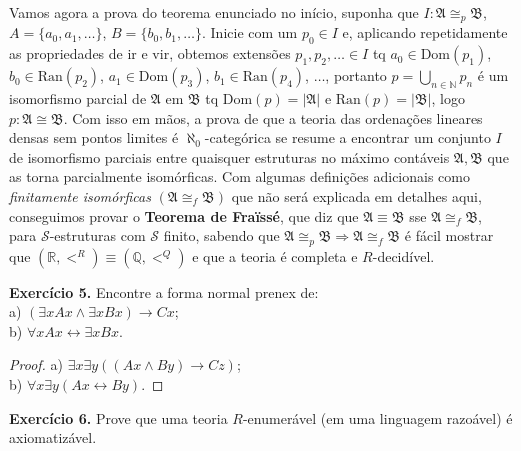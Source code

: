 \documentclass[11pt]{article}
\newcommand{\mc}[1]{\mathcal{#1}}
\newcommand{\mf}[1]{\mathfrak{#1}}
\newcommand{\mbb}[1]{\mathbb{#1}}
\begin{document}
\begin{shaded}
Vamos agora a prova do teorema enunciado no início, suponha que $I:\mf{A}\cong_p\mf{B}$, $A=\{a_0,a_1,\dots\}$, $B=\{b_0,b_1,\dots\}$. Inicie com um $p_0\in I$ e, aplicando repetidamente as propriedades de ir e vir, obtemos extensões $p_1,p_2,\dots\in I$ tq $a_0\in\text{Dom}(p_1)$, $b_0\in\text{Ran}(p_2)$, $a_1\in\text{Dom}(p_3)$, $b_1\in\text{Ran}(p_4)$, $\dots$, portanto $p=\bigcup_{n\in\mbb{N}}p_n$ é um isomorfismo parcial de $\mf{A}$ em $\mf{B}$ tq $\text{Dom}(p)=|\mf{A}|$ e $\text{Ran}(p)=|\mf{B}|$, logo $p:\mf{A}\cong\mf{B}$. Com isso em mãos, a prova de que a teoria das ordenações lineares densas sem pontos limites é $\aleph_0$-categórica se resume a encontrar um conjunto $I$ de isomorfismo parciais entre quaisquer estruturas no máximo contáveis $\mf{A},\mf{B}$ que as torna parcialmente isomórficas. Com algumas definições adicionais como \textit{finitamente isomórficas} $(\mf{A}\cong_f\mf{B})$ que não será explicada em detalhes aqui, conseguimos provar o \textbf{Teorema de Fraïssé}, que diz que $\mf{A}\equiv\mf{B}$ sse $\mf{A}\cong_f\mf{B}$, para $\mc{S}$-estruturas com $\mc{S}$ finito, sabendo que $\mf{A}\cong_p\mf{B}\Rightarrow\mf{A}\cong_f\mf{B}$ é fácil mostrar que $(\mbb{R},<^R)\equiv(\mbb{Q},<^Q)$ e que a teoria é completa e $R$-decidível.
\end{shaded}

\begin{shaded}
\textbf{Exercício 5.} Encontre a forma normal prenex de:\\
a) $(\exists xAx\wedge\exists xBx)\to Cx$;\\
b) $\forall xAx\leftrightarrow\exists xBx$.
\end{shaded}

\begin{proof}
    a) $\exists x\exists y((Ax\wedge By)\to Cz)$;\\
    b) $\forall x\exists y(Ax\leftrightarrow By)$.
\end{proof}

\begin{shaded}
\textbf{Exercício 6.} Prove que uma teoria $R$-enumerável (em uma linguagem razoável) é axiomatizável.
\end{shaded}
\end{document}
